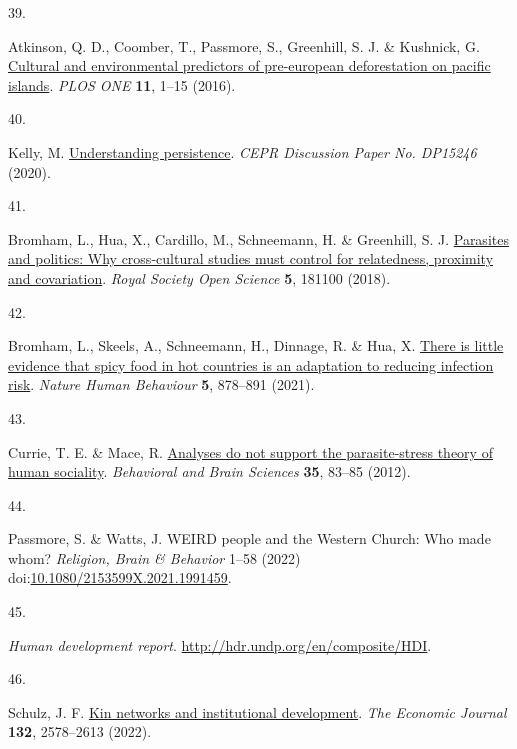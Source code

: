 \documentclass[
  man,floatsintext]{apa6}
\newlength{\cslhangindent}
\newlength{\csllabelwidth}
\newlength{\cslentryspacingunit} %
\newenvironment{CSLReferences}[2] %
 {%
  \setlength{\parindent}{0pt}
  \ifodd #1
  \let\oldpar\par
  \def\par{\hangindent=\cslhangindent\oldpar}
  \fi
  \setlength{\parskip}{#2\cslentryspacingunit}
 }%
 {}
\newcommand{\CSLLeftMargin}[1]{\parbox[t]{\csllabelwidth}{#1}}
\newcommand{\CSLRightInline}[1]{\parbox[t]{\linewidth - \csllabelwidth}{#1}\break}
\begin{document}
\begin{CSLReferences}{0}{0}
\leavevmode{}%
\CSLLeftMargin{39. }%
\CSLRightInline{Atkinson, Q. D., Coomber, T., Passmore, S., Greenhill, S. J. \& Kushnick, G. \href{https://doi.org/10.1371/journal.pone.0156340}{Cultural and environmental predictors of pre-european deforestation on pacific islands}. \emph{PLOS ONE} \textbf{11}, 1--15 (2016).}

\leavevmode{}%
\CSLLeftMargin{40. }%
\CSLRightInline{Kelly, M. \href{http://ssrn.com/abstract=3688200}{Understanding persistence}. \emph{CEPR Discussion Paper No. DP15246} (2020).}

\leavevmode{}%
\CSLLeftMargin{41. }%
\CSLRightInline{Bromham, L., Hua, X., Cardillo, M., Schneemann, H. \& Greenhill, S. J. \href{https://doi.org/10.1098/rsos.181100}{Parasites and politics: Why cross-cultural studies must control for relatedness, proximity and covariation}. \emph{Royal Society Open Science} \textbf{5}, 181100 (2018).}

\leavevmode{}%
\CSLLeftMargin{42. }%
\CSLRightInline{Bromham, L., Skeels, A., Schneemann, H., Dinnage, R. \& Hua, X. \href{https://doi.org/10.1038/s41562-020-01039-8}{There is little evidence that spicy food in hot countries is an adaptation to reducing infection risk}. \emph{Nature Human Behaviour} \textbf{5}, 878--891 (2021).}

\leavevmode{}%
\CSLLeftMargin{43. }%
\CSLRightInline{Currie, T. E. \& Mace, R. \href{https://doi.org/10.1017/S0140525X11000963}{Analyses do not support the parasite-stress theory of human sociality}. \emph{Behavioral and Brain Sciences} \textbf{35}, 83--85 (2012).}

\leavevmode{}%
\CSLLeftMargin{44. }%
\CSLRightInline{Passmore, S. \& Watts, J. {WEIRD} people and the {W}estern {C}hurch: Who made whom? \emph{Religion, Brain \& Behavior} 1--58 (2022) doi:\href{https://doi.org/10.1080/2153599X.2021.1991459}{10.1080/2153599X.2021.1991459}.}

\leavevmode{}%
\CSLLeftMargin{45. }%
\CSLRightInline{\emph{Human development report}. \url{http://hdr.undp.org/en/composite/HDI}.}

\leavevmode{}%
\CSLLeftMargin{46. }%
\CSLRightInline{Schulz, J. F. \href{https://doi.org/10.1093/ej/ueac027}{Kin networks and institutional development}. \emph{The Economic Journal} \textbf{132}, 2578--2613 (2022).}


\end{CSLReferences}
\end{document}
